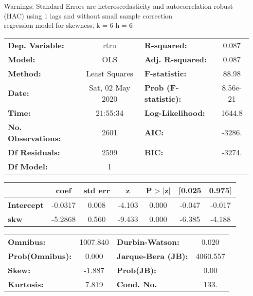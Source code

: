 Warnings: \newline
 [1] Standard Errors are heteroscedasticity and autocorrelation robust (HAC) using 1 lags and without small sample correction\\ 

regression model for skewness, k = 6 h = 6\begin{center}
\begin{tabular}{lclc}
\toprule
\textbf{Dep. Variable:}    &       rtrn       & \textbf{  R-squared:         } &     0.087   \\
\textbf{Model:}            &       OLS        & \textbf{  Adj. R-squared:    } &     0.087   \\
\textbf{Method:}           &  Least Squares   & \textbf{  F-statistic:       } &     88.98   \\
\textbf{Date:}             & Sat, 02 May 2020 & \textbf{  Prob (F-statistic):} &  8.56e-21   \\
\textbf{Time:}             &     21:55:34     & \textbf{  Log-Likelihood:    } &    1644.8   \\
\textbf{No. Observations:} &        2601      & \textbf{  AIC:               } &    -3286.   \\
\textbf{Df Residuals:}     &        2599      & \textbf{  BIC:               } &    -3274.   \\
\textbf{Df Model:}         &           1      & \textbf{                     } &             \\
\bottomrule
\end{tabular}
\begin{tabular}{lcccccc}
                   & \textbf{coef} & \textbf{std err} & \textbf{z} & \textbf{P$> |$z$|$} & \textbf{[0.025} & \textbf{0.975]}  \\
\midrule
\textbf{Intercept} &      -0.0317  &        0.008     &    -4.103  &         0.000        &       -0.047    &       -0.017     \\
\textbf{skw}       &      -5.2868  &        0.560     &    -9.433  &         0.000        &       -6.385    &       -4.188     \\
\bottomrule
\end{tabular}
\begin{tabular}{lclc}
\textbf{Omnibus:}       & 1007.840 & \textbf{  Durbin-Watson:     } &    0.020  \\
\textbf{Prob(Omnibus):} &   0.000  & \textbf{  Jarque-Bera (JB):  } & 4060.557  \\
\textbf{Skew:}          &  -1.887  & \textbf{  Prob(JB):          } &     0.00  \\
\textbf{Kurtosis:}      &   7.819  & \textbf{  Cond. No.          } &     133.  \\
\bottomrule
\end{tabular}
\end{center}

